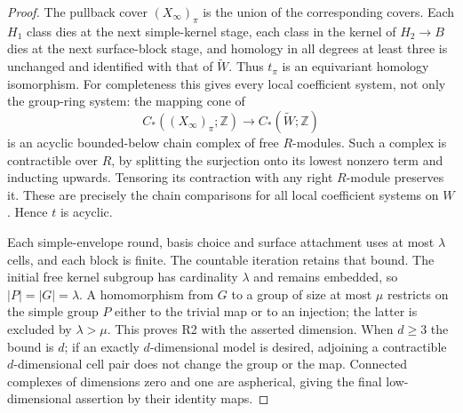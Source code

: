 \begin{proof}
The pullback cover $(X_\infty)_\pi$ is the union of the
corresponding covers. Each $H_1$ class dies at the next
simple-kernel stage, each class in the kernel of $H_2\to B$
dies at the next surface-block stage, and homology in all
degrees at least three is unchanged and identified with that
of $\widetilde W$. Thus $t_\pi$ is an equivariant homology
isomorphism. For completeness this gives every local coefficient
system, not only the group-ring system: the mapping cone of
\[
 C_*((X_\infty)_\pi;\mathbb Z)\longrightarrow
 C_*(\widetilde W;\mathbb Z)
\]
is an acyclic bounded-below chain complex of free $R$-modules.
Such a complex is contractible over $R$, by splitting the
surjection onto its lowest nonzero term and inducting upwards.
Tensoring its contraction with any right $R$-module preserves
it. These are precisely the chain comparisons for all local
coefficient systems on $W$. Hence $t$ is acyclic.

Each simple-envelope round, basis choice and surface attachment
uses at most $\lambda$ cells, and each block is finite.
The countable iteration retains that bound. The initial free
kernel subgroup has cardinality $\lambda$ and remains embedded,
so $|P|=|G|=\lambda$. A homomorphism from $G$ to a group of
size at most $\mu$ restricts on the simple group $P$ either to
the trivial map or to an injection; the latter is excluded by
$\lambda>\mu$. This proves R2 with the asserted dimension.
When $d\geq3$ the bound is $d$; if an exactly $d$-dimensional
model is desired, adjoining a contractible $d$-dimensional cell
pair does not change the group or the map. Connected complexes
of dimensions zero and one are aspherical, giving the final
low-dimensional assertion by their identity maps.
\end{proof}


